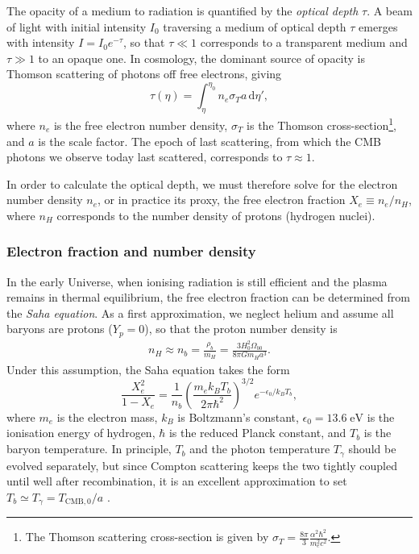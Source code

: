 \documentclass[twocolumn]{aa}
\begin{document}
The opacity of a medium to radiation is quantified by the \textit{optical depth} $\tau$. A beam of light with initial intensity $I_0$ traversing a medium of optical depth $\tau$ emerges with intensity $I = I_0 e^{-\tau}$, so that $\tau \ll 1$ corresponds to a transparent medium and $\tau \gg 1$ to an opaque one. In cosmology, the dominant source of opacity is Thomson scattering of photons off free electrons, giving
\begin{equation*}
    \tau(\eta) = \int_\eta^{\eta_0} n_e \sigma_T a \, \mathrm{d}\eta',
\end{equation*}
where $n_e$ is the free electron number density, $\sigma_T$ is the Thomson cross-section\footnote{The Thomson scattering cross-section is given by $\displaystyle\sigma_T = \frac{8\pi}{3}\frac{\alpha^2\hbar^2}{m_e^2c^2}$.}, and $a$ is the scale factor. The epoch of last scattering, from which the CMB photons we observe today last scattered, corresponds to $\tau \approx 1$.

In order to calculate the optical depth, we must therefore solve for the electron number density $n_e$, or in practice its proxy, the free electron fraction $X_e \equiv n_e/n_H$, where $n_H$ corresponds to the number density of protons (hydrogen nuclei).

\subsubsection{Electron fraction and number density}
\label{theory:Xe and ne}
In the early Universe, when ionising radiation is still efficient and the plasma remains in thermal equilibrium, the free electron fraction can be determined from the \textit{Saha equation}. As a first approximation, we neglect helium and assume all baryons are protons ($Y_p = 0$), so that the proton number density is
\begin{align*}
      n_H \approx n_b = \frac{\rho_b}{m_H} = \frac{3H_0^2\Omega_{b0}}{8\pi G m_H a^3}.
\end{align*}
Under this assumption, the Saha equation takes the form
\begin{equation}
      \frac{X_e^2}{1-X_e} = \frac{1}{n_b} \left(\frac{m_e k_B T_b}{2\pi \hbar^2}\right)^{3/2} e^{-\epsilon_0/k_BT_b},\label{eq:saha only hydrogen}
\end{equation}
where $m_e$ is the electron mass, $k_B$ is Boltzmann's constant, $\epsilon_0 = 13.6\;\mathrm{eV}$ is the ionisation energy of hydrogen, $\hbar$ is the reduced Planck constant, and $T_b$ is the baryon temperature. In principle, $T_b$ and the photon temperature $T_\gamma$ should be evolved separately, but since Compton scattering keeps the two tightly coupled until well after recombination, it is an excellent approximation to set $T_b \simeq T_\gamma = T_\mathrm{CMB,0}/a$ \citep[see appendix]{winther_milestone2}. 
\end{document}
